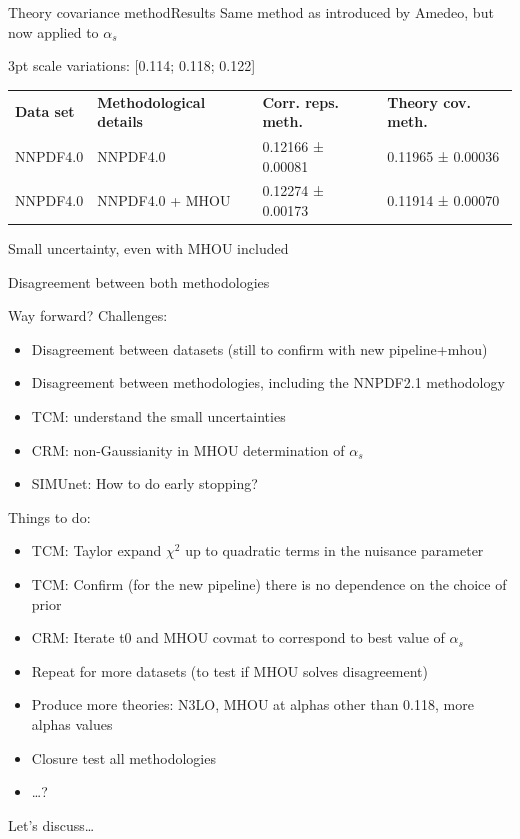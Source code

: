 \documentclass[aspectratio=169, 8pt,t]{beamer}
\begin{document}
\begin{frame}{Theory covariance method}{Results}
  Same method as introduced by Amedeo, but now applied to $\alpha_s$

  \vspace*{0.5em}
  3pt scale variations: [0.114; 0.118; 0.122]

  \vspace*{2em}

  \begin{table}[]
    \begin{tabular}{llll}
    \textbf{Data set} & \textbf{Methodological details} & \textbf{Corr. reps. meth.} & \textbf{Theory cov. meth.}       \\
    NNPDF4.0          & NNPDF4.0                        & 0.12166 ± 0.00081          & {0.11965 ± 0.00036} \\
    NNPDF4.0          & NNPDF4.0 + MHOU                 & 0.12274 ± 0.00173          & {0.11914 ± 0.00070}
    \end{tabular}
  \end{table}

  \vspace*{1em}
  Small uncertainty, even with MHOU included

  \vspace*{0.5em}
  Disagreement between both methodologies

\end{frame}



\begin{frame}{Way forward?}
  Challenges:
  \begin{itemize}
    \item Disagreement between datasets (still to confirm with new pipeline+mhou)
    \item Disagreement between methodologies, including the NNPDF2.1 methodology
    \item TCM: understand the small uncertainties
    \item CRM: non-Gaussianity in MHOU determination of $\alpha_s$
    \item SIMUnet: How to do early stopping?
  \end{itemize}

  Things to do:
  \begin{itemize}
    \item TCM: Taylor expand $\chi^2$ up to quadratic terms in the nuisance parameter
    \item TCM: Confirm (for the new pipeline) there is no dependence on the choice of prior
    \item CRM: Iterate t0 and MHOU covmat to correspond to best value of $\alpha_s$
    \item Repeat for more datasets (to test if MHOU solves disagreement)
    \item Produce more theories: N3LO, MHOU at alphas other than 0.118, more alphas values
    \item Closure test all methodologies
    \item \ldots?
  \end{itemize}

  Let's discuss\ldots
\end{frame}
\end{document}
